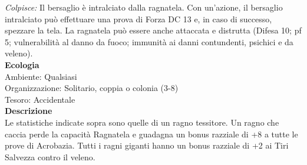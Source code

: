 \begin{multicols}{2}
\emph{Colpisce:} Il bersaglio è intralciato dalla ragnatela. Con un'azione, il bersaglio intralciato può effettuare una prova di Forza DC  13 e, in caso di successo, spezzare la tela. La ragnatela può essere anche attaccata e distrutta (Difesa 10; pf 5; vulnerabilità al danno da fuoco; immunità ai danni contundenti, psichici e da veleno).\\
\textbf{Ecologia}\\
Ambiente: Qualsiasi\\
Organizzazione: Solitario, coppia o colonia (3-8)\\
Tesoro: Accidentale\\
\textbf{Descrizione}\\
Le statistiche indicate sopra sono quelle di un ragno tessitore. Un ragno che caccia perde la capacità Ragnatela e guadagna un bonus razziale di +8 a tutte le prove di Acrobazia. Tutti i ragni giganti hanno un bonus razziale di +2 ai Tiri Salvezza contro il veleno.\\


\end{multicols}
